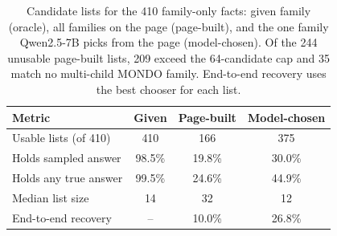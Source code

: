\begin{table}[t]
\centering
\small
\setlength{\tabcolsep}{3pt}
\begin{tabular}{@{}lccc@{}}
\toprule
Metric & Given & Page-built & Model-chosen \\
\midrule
Usable lists (of 410) & 410 & 166 & 375 \\
Holds sampled answer & 98.5\% & 19.8\% & 30.0\% \\
Holds any true answer & 99.5\% & 24.6\% & 44.9\% \\
Median list size & 14 & 32 & 12 \\
End-to-end recovery & -- & 10.0\% & 26.8\% \\
\bottomrule
\end{tabular}
\caption{Candidate lists for the 410 family-only facts: given family (oracle), all families on the page (page-built), and the one family Qwen2.5-7B picks from the page (model-chosen). Of the 244 unusable page-built lists, 209 exceed the 64-candidate cap and 35 match no multi-child MONDO family. End-to-end recovery uses the best chooser for each list.}
\label{tab:lists}
\end{table}